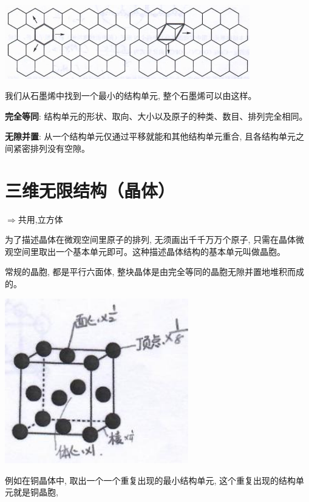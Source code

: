 \documentclass[10pt,cn]{elegantbook}
\begin{document}
 
\begin{center}
	\includegraphics[max width=0.8\textwidth]{image/c123.jpg}
\end{center}
 
 我们从石墨烯中找到一个最小的结构单元, 整个石墨烯可以由这样。
 
\textbf{ 完全等同}: 结构单元的形状、取向、大小以及原子的种类、数目、排列完全相同。
 
\textbf{ 无隙并置}: 从一个结构单元仅通过平移就能和其他结构单元重合, 且各结构单元之间紧密排列没有空隙。
 
 
 \section{三维无限结构（晶体）}
 
 $\Rightarrow$共用,立方体
 
 为了描述晶体在微观空间里原子的排列, 无须画出千千万万个原子, 只需在晶体微观空间里取出一个基本单元即可。这种描述晶体结构的基本单元叫做晶胞。
 
 常规的晶胞, 都是平行六面体, 整块晶体是由完全等同的晶胞无隙并置地堆积而成的。
 
 \begin{center}
 	\includegraphics[max width=0.6\textwidth]{image/c125-2.jpg}
 \end{center}
 
 例如在铜晶体中, 取出一个一个重复出现的最小结构单元, 这个重复出现的结构单元就是铜晶胞,
 
\end{document}
